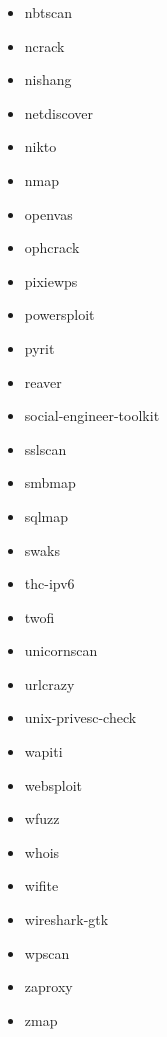 \documentclass{article}
\begin{document}
\begin{itemize}
	\item nbtscan
	\item ncrack
	\item nishang
	\item netdiscover
	\item nikto
	\item nmap
	\item openvas
	\item ophcrack
	\item pixiewps
	\item powersploit
	\item pyrit
	\item reaver
	\item social-engineer-toolkit
	\item sslscan
	\item smbmap
	\item sqlmap
	\item swaks
	\item thc-ipv6
	\item twofi
	\item unicornscan
	\item urlcrazy
	\item unix-privesc-check
	\item wapiti
	\item websploit
	\item wfuzz
	\item whois
	\item wifite
	\item wireshark-gtk
	\item wpscan
	\item zaproxy
	\item zmap
\end{itemize}
\fi
\end{document}
